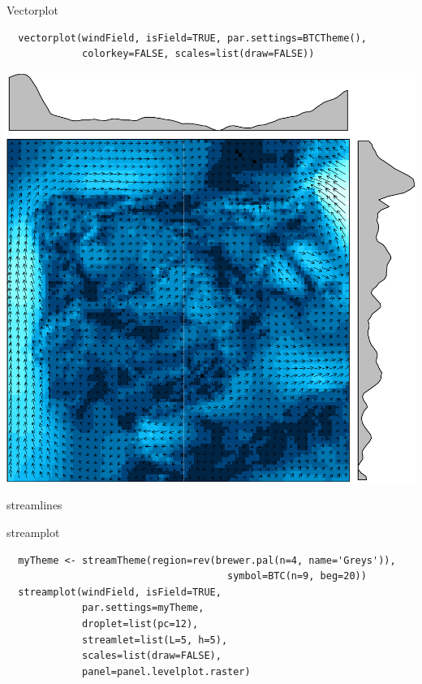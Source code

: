 \documentclass[xcolor={usenames,svgnames,dvipsnames}]{beamer}
\begin{document}
\begin{frame}[fragile,label=sec-5-3]{Vectorplot}
 \lstset{language=R,label= ,caption= ,numbers=none}
\begin{lstlisting}
  vectorplot(windField, isField=TRUE, par.settings=BTCTheme(),
             colorkey=FALSE, scales=list(draw=FALSE))
\end{lstlisting}


\includegraphics[width=.9\linewidth]{figs/vectorplot.pdf}
\end{frame}

\begin{frame}[label=sec-5-4]{streamlines}
\end{frame}

\begin{frame}[fragile,label=sec-5-5]{streamplot}
 \lstset{language=R,label= ,caption= ,numbers=none}
\begin{lstlisting}
  myTheme <- streamTheme(region=rev(brewer.pal(n=4, name='Greys')),
                                      symbol=BTC(n=9, beg=20))
  streamplot(windField, isField=TRUE,
             par.settings=myTheme,
             droplet=list(pc=12),
             streamlet=list(L=5, h=5),
             scales=list(draw=FALSE),
             panel=panel.levelplot.raster)
\end{lstlisting}
\end{frame}
\end{document}
